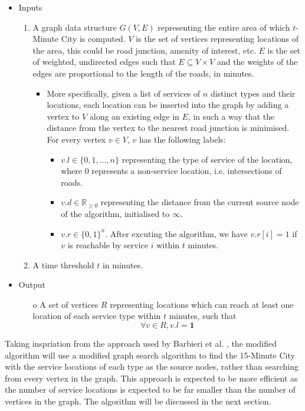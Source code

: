 \begin{itemize}
    \item Inputs
    \begin{enumerate}
        \item A graph data structure $G(V,E)$ representing the entire area of which $t$-Minute City is computed. $V$ is the set of vertices representing locations of the area, this could be road junction, amenity of interest, etc. $E$ is the set of weighted, undirected edges such that $E\subseteq V\times V$ and the weights of the edges are proportional to the length of the roads, in minutes.
        \begin{itemize}
            \item More specifically, given a list of services of $n$ distinct types and their locations, each location can be inserted into the graph by adding a vertex to $V$ along an existing edge in $E$, in such a way that the distance from the vertex to the nearest road junction is minimised. For every vertex $v\in V$, $v$ has the following labels:

            \begin{itemize}
                \item $v.l\in\{0,1,...,n\}$ representing the type of service of the location, where $0$ represents a non-service location, i.e. intersections of roads.
                \item $v.d \in \mathbb{R}_{\geq 0}$ representing the distance from the current source node of the algorithm, initialised to $\infty$.
                \item $v.r\in\{0,1\}^{n}$. After excuting the algorithm, we have $v.r[i]=1$ if $v$ is reachable by service $i$ within $t$ minutes.
            \end{itemize}            
        \end{itemize}
        \item A time threshold $t$ in minutes.
    \end{enumerate}
    \item Output
    \begin{itemize}
        \item[o] A set of vertices $R$ representing locations which can reach at least one location of each service type within $t$ minutes, such that $$\forall v\in R, v.l = \mathbf{1}$$
    \end{itemize}
\end{itemize}

Taking inspriation from the approach used by Barbieri et al. \cite{barbieri_graph_2023}, the modified algorithm will use a modified graph search algorithm to find the 15-Minute City with the service locations of each type as the source nodes, rather than searching from every vertex in the graph. This approach is expected to be more efficient as the number of service locations is expected to be far smaller than the number of vertices in the graph. The algorithm will be discussed in the next section.